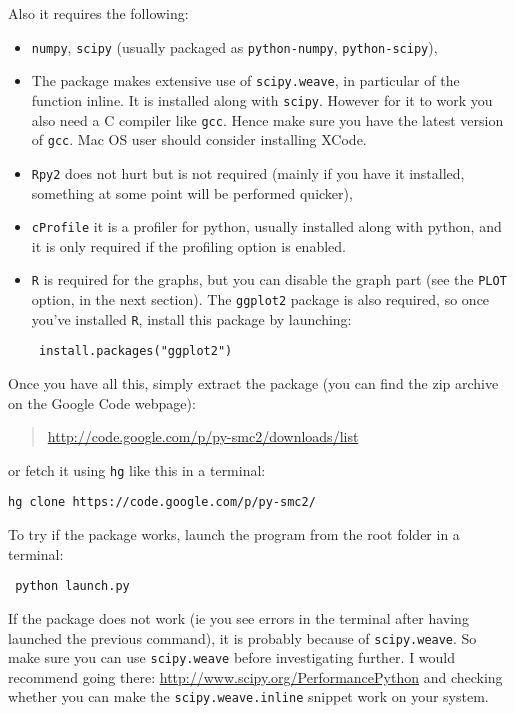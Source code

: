 \documentclass[a4paper,10pt]{paper}
\begin{document}
Also it requires the following:
\begin{itemize}
 \item \texttt{numpy}, \texttt{scipy} (usually packaged as \texttt{python-numpy}, \texttt{python-scipy}),
 \item The package makes extensive use of \texttt{scipy.weave}, in particular of the function inline. It is installed along with \texttt{scipy}. However for it to work you also 
need a C compiler like \texttt{gcc}. Hence make sure you have the latest version of \texttt{gcc}. Mac OS user should consider installing XCode.
 \item \texttt{Rpy2} does not hurt but is not required (mainly if you have it installed, something at some point will be performed quicker),
 \item \texttt{cProfile} it is a profiler for python, usually installed along with python,  and it is only required if the profiling option is enabled.
 \item \texttt{R} is required for the graphs, but you can disable the graph part (see the \texttt{PLOT} option, in the next section). 
The \texttt{ggplot2} package is also required, so once you've installed \texttt{R}, install this package by launching:
\begin{lstlisting}
 install.packages("ggplot2")
\end{lstlisting}
\end{itemize}

Once you have all this, simply extract the package (you can find the zip archive on the Google Code webpage):
\begin{quote}
 \href{http://code.google.com/p/py-smc2/downloads/list}{http://code.google.com/p/py-smc2/downloads/list}
\end{quote}

or fetch it using \texttt{hg} like this in a terminal:
\begin{lstlisting}
hg clone https://code.google.com/p/py-smc2/
\end{lstlisting}

To try if the package works, launch the program from the root folder in a terminal:
\begin{center}
 \begin{lstlisting}
 python launch.py
\end{lstlisting}
\end{center}

If the package does not work (ie you see errors in the terminal after having launched the previous command), it is probably because of \texttt{scipy.weave}. So make sure you can use \texttt{scipy.weave} before 
investigating further. I would recommend going there:
\href{http://www.scipy.org/PerformancePython}{http://www.scipy.org/PerformancePython}
and checking whether you can make the \texttt{scipy.weave.inline} snippet work on your system.
\end{document}
